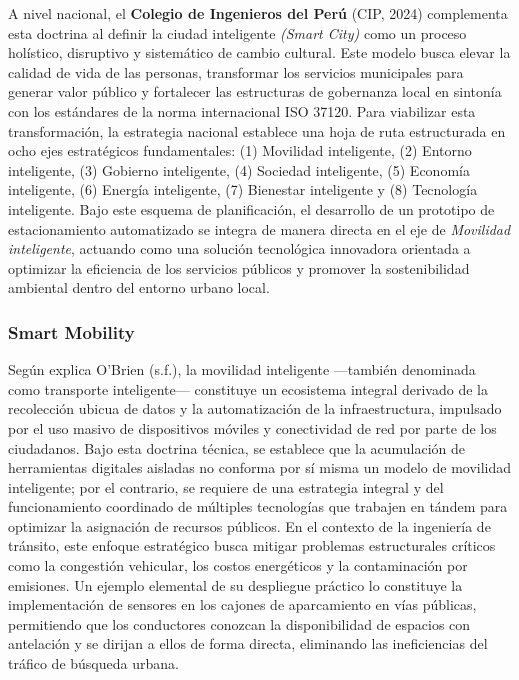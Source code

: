 \documentclass[12pt,a4paper]{article}
\begin{document}
A nivel nacional, el \textbf{Colegio de Ingenieros del Perú} (CIP, 2024) complementa esta doctrina al definir la ciudad inteligente \textit{(Smart City)} como un proceso holístico, disruptivo y sistemático de cambio cultural. Este modelo busca elevar la calidad de vida de las personas, transformar los servicios municipales para generar valor público y fortalecer las estructuras de gobernanza local en sintonía con los estándares de la norma internacional ISO 37120. Para viabilizar esta transformación, la estrategia nacional establece una hoja de ruta estructurada en ocho ejes estratégicos fundamentales: (1) Movilidad inteligente, (2) Entorno inteligente, (3) Gobierno inteligente, (4) Sociedad inteligente, (5) Economía inteligente, (6) Energía inteligente, (7) Bienestar inteligente y (8) Tecnología inteligente. Bajo este esquema de planificación, el desarrollo de un prototipo de estacionamiento automatizado se integra de manera directa en el eje de \textit{Movilidad inteligente}, actuando como una solución tecnológica innovadora orientada a optimizar la eficiencia de los servicios públicos y promover la sostenibilidad ambiental dentro del entorno urbano local.

\subsubsection{Smart Mobility}

Según explica O'Brien (s.f.), la movilidad inteligente —también denominada como transporte inteligente— constituye un ecosistema integral derivado de la recolección ubicua de datos y la automatización de la infraestructura, impulsado por el uso masivo de dispositivos móviles y conectividad de red por parte de los ciudadanos. Bajo esta doctrina técnica, se establece que la acumulación de herramientas digitales aisladas no conforma por sí misma un modelo de movilidad inteligente; por el contrario, se requiere de una estrategia integral y del funcionamiento coordinado de múltiples tecnologías que trabajen en tándem para optimizar la asignación de recursos públicos. En el contexto de la ingeniería de tránsito, este enfoque estratégico busca mitigar problemas estructurales críticos como la congestión vehicular, los costos energéticos y la contaminación por emisiones. Un ejemplo elemental de su despliegue práctico lo constituye la implementación de sensores en los cajones de aparcamiento en vías públicas, permitiendo que los conductores conozcan la disponibilidad de espacios con antelación y se dirijan a ellos de forma directa, eliminando las ineficiencias del tráfico de búsqueda urbana.
\end{document}
